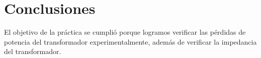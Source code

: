 \documentclass[]{article}
\begin{document}
	
	
	
    
	
	\section{Conclusiones}
	
	El objetivo de la práctica se cumplió porque logramos verificar las pérdidas de potencia del transformador experimentalmente, además de verificar la impedancia del transformador.

	

    


	
	
\end{document}
